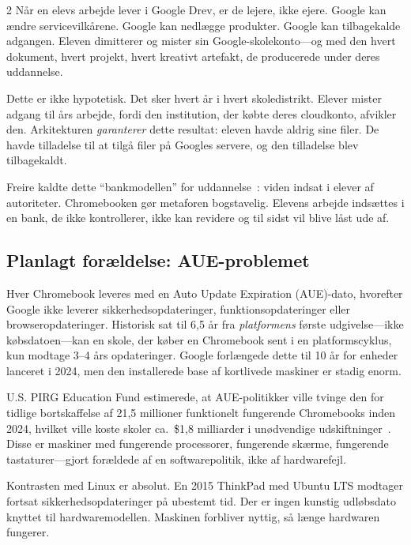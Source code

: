 \documentclass[11pt, a4paper]{article}
\begin{document}
\begin{multicols}{2}
Når en elevs arbejde lever i Google Drev, er de lejere, ikke ejere. Google kan ændre servicevilkårene. Google kan nedlægge produkter. Google kan tilbagekalde adgangen. Eleven dimitterer og mister sin Google-skolekonto---og med den hvert dokument, hvert projekt, hvert kreativt artefakt, de producerede under deres uddannelse.

Dette er ikke hypotetisk. Det sker hvert år i hvert skoledistrikt. Elever mister adgang til års arbejde, fordi den institution, der købte deres cloudkonto, afvikler den. Arkitekturen \emph{garanterer} dette resultat: eleven havde aldrig sine filer. De havde tilladelse til at tilgå filer på Googles servere, og den tilladelse blev tilbagekaldt.

Freire kaldte dette ``bankmodellen'' for uddannelse~\citep{freire1970pedagogy}: viden indsat i elever af autoriteter. Chromebooken gør metaforen bogstavelig. Elevens arbejde indsættes i en bank, de ikke kontrollerer, ikke kan revidere og til sidst vil blive låst ude af.

\subsection{Planlagt forældelse: AUE-problemet}

Hver Chromebook leveres med en Auto Update Expiration (AUE)-dato, hvorefter Google ikke leverer sikkerhedsopdateringer, funktionsopdateringer eller browseropdateringer. Historisk sat til 6,5 år fra \emph{platformens} første udgivelse---ikke købsdatoen---kan en skole, der køber en Chromebook sent i en platformscyklus, kun modtage 3--4 års opdateringer. Google forlængede dette til 10 år for enheder lanceret i 2024, men den installerede base af kortlivede maskiner er stadig enorm.

U.S. PIRG Education Fund estimerede, at AUE-politikker ville tvinge den for tidlige bortskaffelse af 21,5 millioner funktionelt fungerende Chromebooks inden 2024, hvilket ville koste skoler ca.\ \$1,8 milliarder i unødvendige udskiftninger~\citep{pirg2023chromebook}. Disse er maskiner med fungerende processorer, fungerende skærme, fungerende tastaturer---gjort forældede af en softwarepolitik, ikke af hardwarefejl.

Kontrasten med Linux er absolut. En 2015 ThinkPad med Ubuntu LTS modtager fortsat sikkerhedsopdateringer på ubestemt tid. Der er ingen kunstig udløbsdato knyttet til hardwaremodellen. Maskinen forbliver nyttig, så længe hardwaren fungerer.



\end{multicols}
\end{document}
